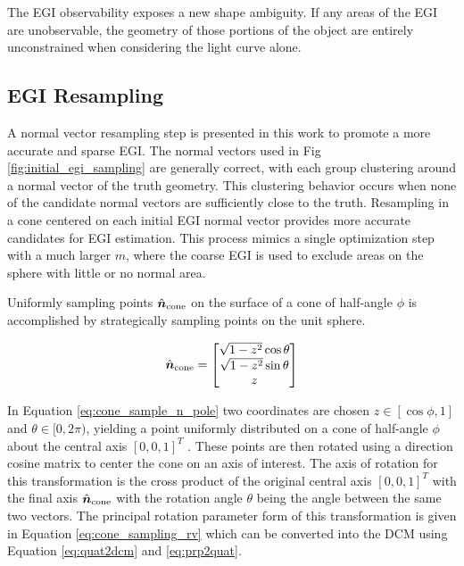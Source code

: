 The EGI observability exposes a new shape ambiguity. If any areas of the EGI are unobservable, the geometry of those portions of the object are entirely unconstrained when considering the light curve alone.

\subsection{EGI Resampling}

A normal vector resampling step is presented in this work to promote a more accurate and sparse EGI. The normal vectors used in Fig \ref{fig:initial_egi_sampling} are generally correct, with each group clustering around a normal vector of the truth geometry. This clustering behavior occurs when none of the candidate normal vectors are sufficiently close to the truth. Resampling in a cone centered on each initial EGI normal vector provides more accurate candidates for EGI estimation. This process mimics a single optimization step with a much larger $m$, where the coarse EGI is used to exclude areas on the sphere with little or no normal area.

Uniformly sampling points $\hat{\bm{n}}_\mathrm{cone}$ on the surface of a cone of half-angle $\phi$ is accomplished by strategically sampling points on the unit sphere. 

\begin{equation} \label{eq:cone_sample_n_pole}
  \hat{\bm{n}}_\mathrm{cone} = \begin{bmatrix}
    \sqrt{1-z^2}\cos{\theta} \\
    \sqrt{1-z^2}\sin{\theta} \\
    z \\
  \end{bmatrix}
\end{equation}

In Equation \ref{eq:cone_sample_n_pole} two coordinates are chosen $z \in [\cos{\phi}, 1]$ and $\theta \in [0, 2\pi)$, yielding a point uniformly distributed on a cone of half-angle $\phi$ about the central axis $[0, 0, 1]^T$ \cite{cone_sampling_wolfram}. These points are then rotated using a direction cosine matrix to center the cone on an axis of interest. The axis of rotation for this transformation is the cross product of the original central axis $[0, 0, 1]^T$ with the final axis $\hat{\bm{n}}_\mathrm{cone}$ with the rotation angle $\theta$ being the angle between the same two vectors. The principal rotation parameter form of this transformation is given in Equation \ref{eq:cone_sampling_rv} which can be converted into the DCM using Equation \ref{eq:quat2dcm} and \ref{eq:prp2quat}.

